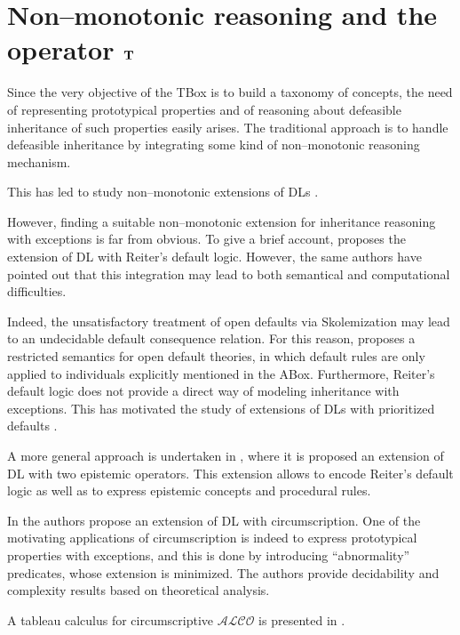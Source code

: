 \documentclass[a4paper, 11pt, oneside]{duthesis}
\newcommand{\tip}{{\bf T}}
\begin{document}
\section{Non--monotonic reasoning and the operator $\tip$}\label{nonmonotonic_reasoning}
Since the very objective of the TBox is to build a taxonomy of concepts, the need of representing prototypical properties and of reasoning about defeasible inheritance of such properties easily arises.
The traditional approach is to handle defeasible inheritance by integrating some kind of non--monotonic reasoning mechanism.

This has led to study non--monotonic extensions of DLs \cite{baader95a, baader95b, bonattilutzwolterkr06, casinistraccia2010, donini98, donini2002, eiter2004, straccia93}.

However, finding a suitable non--monotonic extension for inheritance reasoning with exceptions is far from obvious.
To give a brief account, \cite{baader95a} proposes the extension of DL with Reiter's default logic.
However, the same authors have pointed out that this integration may lead to both semantical and computational difficulties.

Indeed, the unsatisfactory treatment of open defaults via Skolemization may lead to an undecidable default consequence relation. For this reason, \cite{baader95a} proposes a restricted semantics for open default theories, in which default rules are only applied to individuals explicitly mentioned in the ABox.
Furthermore, Reiter's default logic does not provide a direct way of modeling inheritance with exceptions.
This has motivated the study of extensions of DLs with prioritized defaults
\cite{straccia93,baader95b}.

A more general approach is undertaken in \cite{donini2002}, where it is proposed an extension of DL with two epistemic operators. This extension allows to encode Reiter's default logic as well as to express epistemic concepts and procedural rules.

In \cite{bonattilutz} the authors propose an extension of DL with circumscription. One of the motivating applications of circumscription is indeed to express prototypical properties with exceptions, and this is done by introducing ``abnormality'' predicates, whose extension is minimized.
The authors provide decidability and complexity results based on theoretical analysis.

A tableau calculus for circumscriptive $\mathcal{ALCO}$ is presented in \cite{hitzlertableau}.
\end{document}
